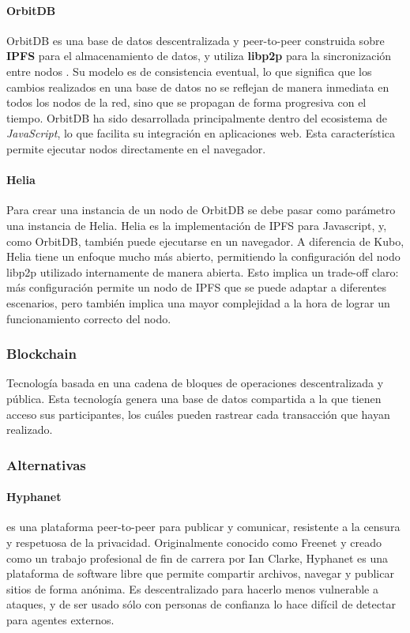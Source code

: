 \paragraph{OrbitDB}
OrbitDB es una base de datos descentralizada y peer-to-peer construida sobre \textbf{IPFS} para el almacenamiento de datos, y utiliza \textbf{libp2p} para la sincronización entre nodos \cite{orbitdb}. Su modelo es de consistencia eventual, lo que significa que los cambios realizados en una base de datos no se reflejan de manera inmediata en todos los nodos de la red, sino que se propagan de forma progresiva con el tiempo.
OrbitDB ha sido desarrollada principalmente dentro del ecosistema de \textit{JavaScript}, lo que facilita su integración en aplicaciones web. Esta característica permite ejecutar nodos directamente en el navegador.

\paragraph{Helia} Para crear una instancia de un nodo de OrbitDB se debe pasar como parámetro una instancia de Helia. Helia \cite{helia} es la implementación de IPFS para Javascript, y, como OrbitDB, también puede ejecutarse en un navegador. A diferencia de Kubo, Helia tiene un enfoque mucho más abierto, permitiendo la configuración del nodo libp2p utilizado internamente de manera abierta. Esto implica un trade-off claro: más configuración permite un nodo de IPFS que se puede adaptar a diferentes escenarios, pero también implica una mayor complejidad a la hora de lograr un funcionamiento correcto del nodo.

\subsubsection{Blockchain}
Tecnología basada en una cadena de bloques de operaciones descentralizada y pública.  Esta tecnología genera una base de datos compartida a la que tienen acceso sus participantes, los cuáles pueden rastrear cada transacción que hayan realizado.\parencite{blockchain}


\subsubsection{Alternativas}
\paragraph{Hyphanet} \cite{hyphanet-white-paper} \cite{hyphanet} es una plataforma peer-to-peer para publicar y comunicar, resistente a la censura y respetuosa de la privacidad. Originalmente conocido como Freenet y creado como un trabajo profesional de fin de carrera por Ian Clarke, Hyphanet es una plataforma de software libre que permite compartir archivos, navegar y publicar sitios de forma anónima. Es descentralizado para hacerlo menos vulnerable a ataques, y de ser usado sólo con personas de confianza lo hace difícil de detectar para agentes externos.

